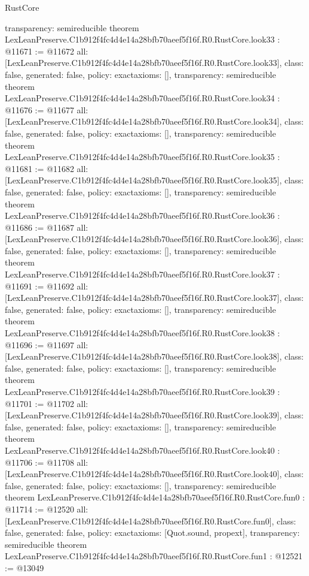 \begin{lexlean}{RustCore}
\begin{coremodule}
{  transparency: semireducible
}
theorem LexLeanPreserve.C1b912f4fc4d4e14a28bfb70aeef5f16f.R0.RustCore.look33 : @11671 := @11672 {
  all: [LexLeanPreserve.C1b912f4fc4d4e14a28bfb70aeef5f16f.R0.RustCore.look33],
  class: false,
  generated: false,
  policy: exact{axioms: []},
  transparency: semireducible
}
theorem LexLeanPreserve.C1b912f4fc4d4e14a28bfb70aeef5f16f.R0.RustCore.look34 : @11676 := @11677 {
  all: [LexLeanPreserve.C1b912f4fc4d4e14a28bfb70aeef5f16f.R0.RustCore.look34],
  class: false,
  generated: false,
  policy: exact{axioms: []},
  transparency: semireducible
}
theorem LexLeanPreserve.C1b912f4fc4d4e14a28bfb70aeef5f16f.R0.RustCore.look35 : @11681 := @11682 {
  all: [LexLeanPreserve.C1b912f4fc4d4e14a28bfb70aeef5f16f.R0.RustCore.look35],
  class: false,
  generated: false,
  policy: exact{axioms: []},
  transparency: semireducible
}
theorem LexLeanPreserve.C1b912f4fc4d4e14a28bfb70aeef5f16f.R0.RustCore.look36 : @11686 := @11687 {
  all: [LexLeanPreserve.C1b912f4fc4d4e14a28bfb70aeef5f16f.R0.RustCore.look36],
  class: false,
  generated: false,
  policy: exact{axioms: []},
  transparency: semireducible
}
theorem LexLeanPreserve.C1b912f4fc4d4e14a28bfb70aeef5f16f.R0.RustCore.look37 : @11691 := @11692 {
  all: [LexLeanPreserve.C1b912f4fc4d4e14a28bfb70aeef5f16f.R0.RustCore.look37],
  class: false,
  generated: false,
  policy: exact{axioms: []},
  transparency: semireducible
}
theorem LexLeanPreserve.C1b912f4fc4d4e14a28bfb70aeef5f16f.R0.RustCore.look38 : @11696 := @11697 {
  all: [LexLeanPreserve.C1b912f4fc4d4e14a28bfb70aeef5f16f.R0.RustCore.look38],
  class: false,
  generated: false,
  policy: exact{axioms: []},
  transparency: semireducible
}
theorem LexLeanPreserve.C1b912f4fc4d4e14a28bfb70aeef5f16f.R0.RustCore.look39 : @11701 := @11702 {
  all: [LexLeanPreserve.C1b912f4fc4d4e14a28bfb70aeef5f16f.R0.RustCore.look39],
  class: false,
  generated: false,
  policy: exact{axioms: []},
  transparency: semireducible
}
theorem LexLeanPreserve.C1b912f4fc4d4e14a28bfb70aeef5f16f.R0.RustCore.look40 : @11706 := @11708 {
  all: [LexLeanPreserve.C1b912f4fc4d4e14a28bfb70aeef5f16f.R0.RustCore.look40],
  class: false,
  generated: false,
  policy: exact{axioms: []},
  transparency: semireducible
}
theorem LexLeanPreserve.C1b912f4fc4d4e14a28bfb70aeef5f16f.R0.RustCore.fun0 : @11714 := @12520 {
  all: [LexLeanPreserve.C1b912f4fc4d4e14a28bfb70aeef5f16f.R0.RustCore.fun0],
  class: false,
  generated: false,
  policy: exact{axioms: [Quot.sound, propext]},
  transparency: semireducible
}
theorem LexLeanPreserve.C1b912f4fc4d4e14a28bfb70aeef5f16f.R0.RustCore.fun1 : @12521 := @13049 {
}
\end{coremodule}
\end{lexlean}
